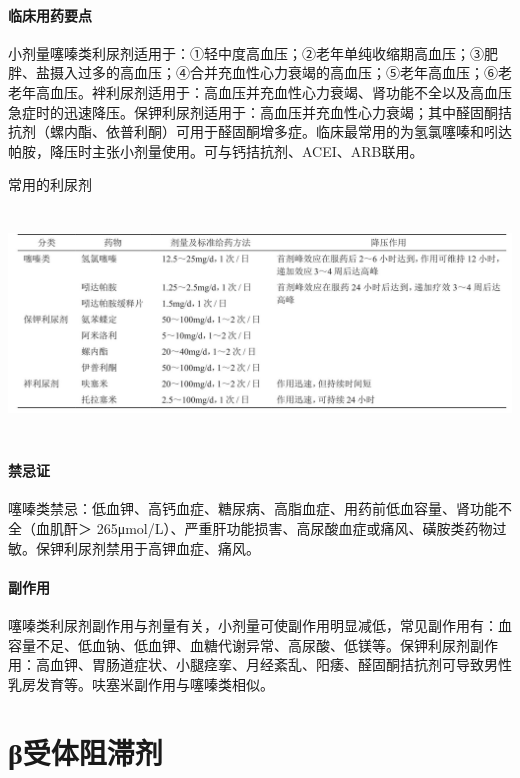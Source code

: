 \paragraph{临床用药要点}

小剂量噻嗪类利尿剂适用于：①轻中度高血压；②老年单纯收缩期高血压；③肥胖、盐摄入过多的高血压；④合并充血性心力衰竭的高血压；⑤老年高血压；⑥老老年高血压。袢利尿剂适用于：高血压并充血性心力衰竭、肾功能不全以及高血压急症时的迅速降压。保钾利尿剂适用于：高血压并充血性心力衰竭；其中醛固酮拮抗剂（螺内酯、依普利酮）可用于醛固酮增多症。临床最常用的为氢氯噻嗪和吲达帕胺，降压时主张小剂量使用。可与钙拮抗剂、ACEI、ARB联用。

\begin{table}[htbp]
\centering
\caption{常用的利尿剂}
\label{tab150-7}
\includegraphics[width=6.65625in,height=2.375in]{./images/Image00563.jpg}
\end{table}

\paragraph{禁忌证}

噻嗪类禁忌：低血钾、高钙血症、糖尿病、高脂血症、用药前低血容量、肾功能不全（血肌酐＞
265μmol/L）、严重肝功能损害、高尿酸血症或痛风、磺胺类药物过敏。保钾利尿剂禁用于高钾血症、痛风。

\paragraph{副作用}

噻嗪类利尿剂副作用与剂量有关，小剂量可使副作用明显减低，常见副作用有：血容量不足、低血钠、低血钾、血糖代谢异常、高尿酸、低镁等。保钾利尿剂副作用：高血钾、胃肠道症状、小腿痉挛、月经紊乱、阳痿、醛固酮拮抗剂可导致男性乳房发育等。呋塞米副作用与噻嗪类相似。

\protect\hypertarget{text00414.html}{}{}

\section{β受体阻滞剂}

